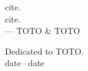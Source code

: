\thispagestyle{empty}
{}

\vspace*{3cm}

\begin{center}
    cite. \\
    cite. \\ \medskip
    --- TOTO \& TOTO    
\end{center}

\medskip

\begin{center}
    Dedicated to TOTO. \\ \smallskip
    date\,--\,date
\end{center}